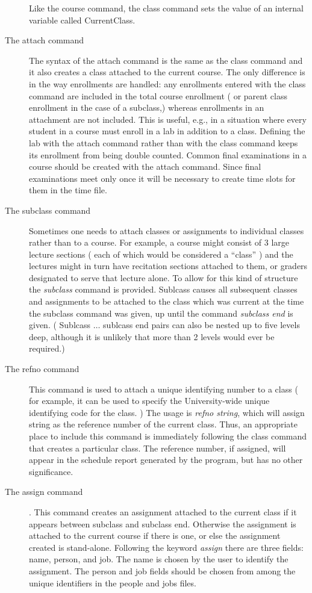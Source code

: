 \begin{description}
Like the course command, the class command sets the value of an internal
variable called CurrentClass. 

\item[The attach command] The syntax of the attach command is the same as
the class command and it also creates a class attached to the current course.
The only difference is in the way enrollments are handled: any enrollments
entered with the class command are included in the total course enrollment
( or parent class enrollment in the case of a subclass,) whereas enrollments
in an attachment are not included. This is useful, e.g., in a situation
where every student in a course must enroll in a lab in addition to a class.
Defining the lab with the attach command rather than with the class command
keeps its enrollment from being double counted. Common final examinations
in a course should be created with the attach command. Since final 
examinations meet only once it will be necessary to create time slots for 
them in the time file.
\item[The subclass command] 
Sometimes one needs to attach classes or assignments to individual classes
rather than to a course. For example, a course might consist of 3 large lecture
sections ( each of which would be considered a ``class'' ) and the 
lectures might in turn have recitation sections attached to them, or graders
designated to serve that lecture alone. To allow for this kind of structure
the {\it subclass} command is provided. Sublcass causes all subsequent
classes and assignments to be attached to the class which was current at the
time the subclass command was given, up until the command {\it subclass end}
is given. ( Sublcass $\dots$ sublcass end pairs can also be nested up to
five levels deep, although it is unlikely that more than 2 levels would ever
be required.)

\item[The refno command ] This command is used to attach a unique identifying
number to a class ( for example, it can be used to specify the University-wide
unique identifying code for the class. ) The usage is {\it refno string},
which will assign string as the reference number of the current class. Thus,
an appropriate place to include this command is immediately following the
class command that creates a particular class. The reference number, if 
assigned, will appear in the schedule report generated by the program, but
has no other significance.

\item[The assign command]. This command creates an assignment attached to
the current class if it appears between subclass and subclass end. Otherwise
the assignment is attached to the current course if there is one, or else
the assignment created is stand-alone. Following the keyword {\it assign}
there are three fields: name, person, and job. The name is chosen by the
user to identify the assignment. The person and job fields should be chosen
from among the unique identifiers in the people and jobs files. 

\end{description}

